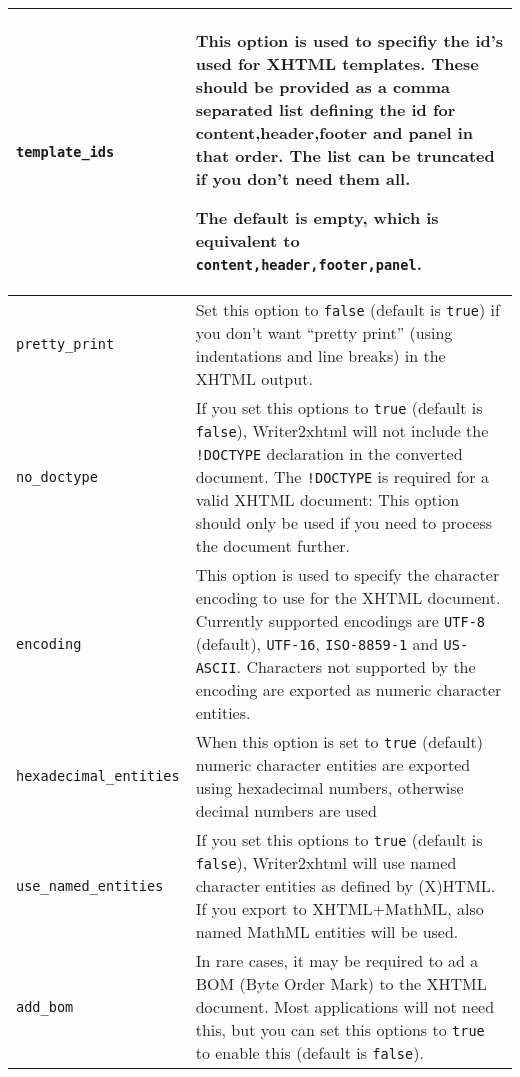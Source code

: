 \documentclass{article}
\newcommand\textstyleSourceText[1]{\texttt{\textmd{#1}}}
\begin{document}
\begin{center}
\begin{tabular}{|m{4.906cm}|m{11.706cm}|}

\hline
{\mdseries \textstyleSourceText{template\_ids}} &
{\mdseries This option is used to specifiy the id's used for XHTML templates. These should be provided as a comma separated list defining the id for content,header,footer and panel in that order. The list can be truncated if you don't need them all.}

{\mdseries The default is empty, which is equivalent to \textstyleSourceText{content,header,footer,panel}.}\\\hline
{\mdseries \textstyleSourceText{pretty\_print}} &
{\mdseries Set this option to \textstyleSourceText{false} (default is \textstyleSourceText{true}) if you don't want ``pretty print'' (using indentations and line breaks) in the XHTML output.}\\\hline
{\mdseries \textstyleSourceText{no\_doctype}} &
{\mdseries If you set this options to \textstyleSourceText{true} (default is \textstyleSourceText{false}), Writer2xhtml will not include the \textstyleSourceText{!DOCTYPE} declaration in the converted document. The \textstyleSourceText{!DOCTYPE} is required for a valid XHTML document: This option should only be used if you need to process the document further.}\\\hline
{\mdseries \textstyleSourceText{encoding }} &
{\mdseries This option is used to specify the character encoding to use for the XHTML document. Currently supported encodings are \textstyleSourceText{UTF-8} (default), \textstyleSourceText{UTF-16}, \textstyleSourceText{ISO-8859-1} and \textstyleSourceText{US-ASCII}. Characters not supported by the encoding are exported as numeric character entities.}\\\hline
{\mdseries \textstyleSourceText{hexadecimal\_entities}} &
{\mdseries When this option is set to \textstyleSourceText{true} (default) numeric character entities are exported using hexadecimal numbers, otherwise decimal numbers are used}\\\hline
{\mdseries \textstyleSourceText{use\_named\_entities}} &
{\mdseries If you set this options to \textstyleSourceText{true} (default is \textstyleSourceText{false}), Writer2xhtml will use named character entities as defined by (X)HTML. If you export to XHTML+MathML, also named MathML entities will be used.}\\\hline
{\mdseries \textstyleSourceText{add\_bom}} &
{\mdseries In rare cases, it may be required to ad a BOM (Byte Order Mark) to the XHTML document. Most applications will not need this, but you can set this options to \textstyleSourceText{true} to enable this (default is \textstyleSourceText{false}).}\\\hline

\end{tabular}
\end{center}
\end{document}
